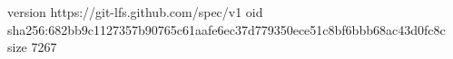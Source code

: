 version https://git-lfs.github.com/spec/v1
oid sha256:682bb9c1127357b90765c61aafe6ec37d779350ece51c8bf6bbb68ac43d0fc8c
size 7267
